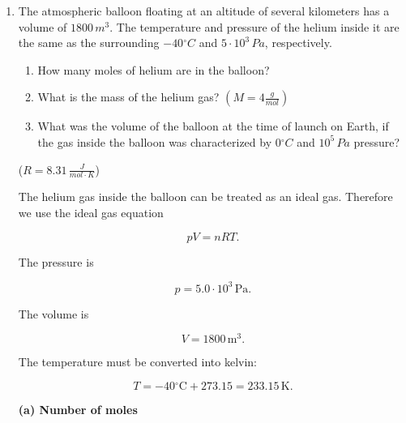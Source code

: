 \documentclass[letterpaper,12pt]{letter}
\begin{document}
\begin{enumerate}[label=\Roman*.]
\begin{enumerate}[label=\arabic*.]
$$\boxed{T=144{}^\circ\mathrm{C}}.$$


\pagebreak
\item The atmospheric balloon floating at an altitude of several kilometers has a volume of $1800\,m^{3}$. The temperature and pressure of the helium inside it are the same as the surrounding $-40{}^{\circ}C$ and $5 \cdot 10^{3}\,Pa$, respectively.
\begin{enumerate}
\item[(a)] How many moles of helium are in the balloon?
\item[(b)] What is the mass of the helium gas? $\left(M = 4 \frac{g}{mol}\right)$
\item[(c)] What was the volume of the balloon at the time of launch on Earth, if the gas inside the balloon was characterized by $0{}^{\circ}C$ and $10^{5}\,Pa$ pressure?
\end{enumerate}
($R=8.31\,\frac{J}{mol\cdot K}$)

\bigskip

\begin{center}
\end{center}

The helium gas inside the balloon can be treated as an ideal gas. Therefore we use the ideal gas equation

$$pV=nRT.$$

The pressure is

$$p=5.0\cdot10^3\,\mathrm{Pa}.$$

The volume is

$$V=1800\,\mathrm{m^3}.$$

The temperature must be converted into kelvin:

$$T=-40{}^\circ\mathrm{C}+273.15=233.15\,\mathrm{K}.$$

\textbf{(a) Number of moles}


\end{enumerate}
\end{enumerate}
\end{document}
